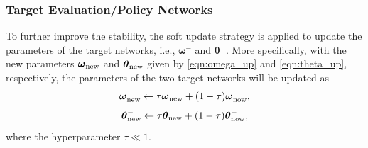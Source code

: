 \documentclass[lettersize,journal]{IEEEtran}
\begin{document}
\subsubsection{Target Evaluation/Policy Networks}
To further improve the stability, the soft update strategy is applied to update the parameters of the target networks, i.e., $\boldsymbol{\omega ^ - }$ and ${\boldsymbol {\theta ^ - }}$. More specifically, with the new parameters $\boldsymbol{\omega }_{\rm new}$ and $\boldsymbol{\theta }_{\rm new}$ given by \eqref{eqn:omega_up} and \eqref{eqn:theta_up}, respectively, the parameters of the two target networks will be updated as
\begin{equation}
    {\boldsymbol {\omega }_{\rm new} ^ -} \leftarrow \tau {\boldsymbol {\omega}_{\rm new}}  + (1 - \tau) {\boldsymbol {\omega }_{\rm now} ^ -},
\end{equation}
\begin{equation}
    {\boldsymbol {\theta }_{\rm new} ^ -} \leftarrow \tau {\boldsymbol {\theta}_{\rm new}}  + (1 - \tau) {\boldsymbol {\theta}_{\rm now} ^ - },
\end{equation}
where the hyperparameter $\tau\ll 1$.
\end{document}
